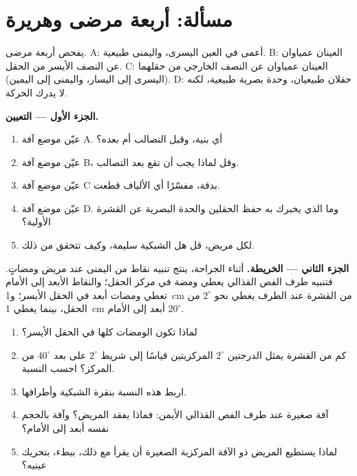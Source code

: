 \section{مسألة: أربعة مرضى وهريرة}

\begin{problem}
\label{pb:g11:vision-and-brain:1}
يفحص أربعة مرضى. A: أعمى في العين اليسرى، واليمنى طبيعية. B: العينان
عمياوان عن النصف الأيسر من الحقل. C: العينان عمياوان عن النصف الخارجي
من حقلهما (اليسرى إلى اليسار، واليمنى إلى اليمين). D: حقلان طبيعيان،
وحدة بصرية طبيعية، لكنه لا يدرك الحركة.

\medskip
\noindent\textbf{الجزء الأول --- التعيين.}
\begin{enumerate}
  \item عيّن موضع آفة A. أي بنية، وقبل التصالب أم بعده؟
  \item عيّن موضع آفة B، وقل لماذا يجب أن تقع بعد التصالب.
  \item عيّن موضع آفة C بدقة، مفسّرًا أي الألياف قطعت.
  \item عيّن موضع آفة D. وما الذي يخبرك به حفظ الحقلين والحدة البصرية
        عن القشرة الأولية؟
  \item لكل مريض، قل هل الشبكية سليمة، وكيف تتحقق من ذلك.
\end{enumerate}

\medskip
\noindent\textbf{الجزء الثاني --- الخريطة.}
أثناء الجراحة، ينتج تنبيه نقاط من  اليمنى عند مريض
ومضاتٍ. فتنبيه طرف الفص القذالي يعطي ومضة في مركز الحقل؛ والنقاط
الأبعد إلى الأمام تعطي ومضات أبعد في الحقل الأيسر؛ و\qty{1}{cm} من
القشرة عند الطرف يغطي نحو $2^\circ$ من الحقل، بينما يغطي \qty{1}{cm}
أبعد إلى الأمام $20^\circ$.
\begin{enumerate}[resume]
  \item لماذا تكون الومضات كلها في الحقل الأيسر؟
  \item كم من القشرة يمثل الدرجتين $2^\circ$ المركزيتين قياسًا إلى شريط
        $2^\circ$ على بعد $40^\circ$ من المركز؟ احسب النسبة.
  \item اربط هذه النسبة بنقرة الشبكية وأطرافها.
  \item آفة صغيرة عند طرف الفص القذالي الأيمن: فماذا يفقد المريض؟
        وآفة بالحجم نفسه أبعد إلى الأمام؟
  \item لماذا يستطيع المريض ذو الآفة المركزية الصغيرة أن يقرأ مع ذلك،
        ببطء، بتحريك عينيه؟
\end{enumerate}


\end{problem}
